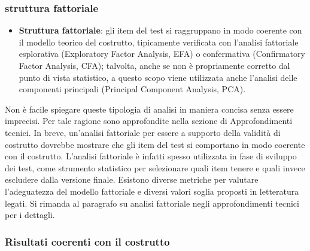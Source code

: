 \documentclass[
  italian,
  letterpaper,
  paper=A4,
  headinclude=on,
  footinclude=on,
  12pt]{scrbook}
\providecommand{\tightlist}{%
  \setlength{\itemsep}{0pt}\setlength{\parskip}{0pt}}
\begin{document}
\subsubsection{struttura fattoriale}\label{struttura-fattoriale}

\begin{itemize}
\tightlist
\item
  \textbf{Struttura fattoriale}: gli item del test si raggruppano in
  modo coerente con il modello teorico del costrutto, tipicamente
  verificata con l'analisi fattoriale esplorativa (Exploratory Factor
  Analysis, EFA) o confermativa (Confirmatory Factor Analysis, CFA);
  talvolta, anche se non è propriamente corretto dal punto di vista
  statistico, a questo scopo viene utilizzata anche l'analisi delle
  componenti principali (Principal Component Analysis, PCA).
\end{itemize}

Non è facile spiegare queste tipologia di analisi in maniera concisa
senza essere imprecisi. Per tale ragione sono approfondite nella sezione
di Approfondimenti tecnici. In breve, un'analisi fattoriale per essere a
supporto della validità di costrutto dovrebbe mostrare che gli item del
test si comportano in modo coerente con il costrutto. L'analisi
fattoriale è infatti spesso utilizzata in fase di sviluppo dei test,
come strumento statistico per selezionare quali item tenere e quali
invece escludere dalla versione finale. Esistono diverse metriche per
valutare l'adeguatezza del modello fattoriale e diversi valori soglia
proposti in letteratura legati. Si rimanda al paragrafo su analisi
fattoriale negli approfondimenti tecnici per i dettagli.

\subsubsection{Risultati coerenti con il
costrutto}\label{risultati-coerenti-con-il-costrutto}
\end{document}
